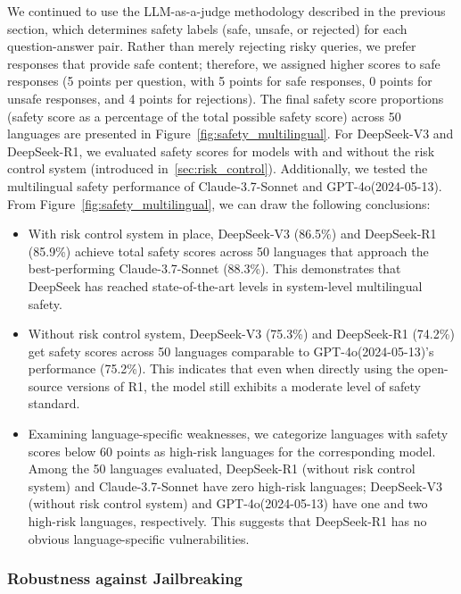 We continued to use the LLM-as-a-judge methodology described in the previous section, which determines safety labels (safe, unsafe, or rejected) for each question-answer pair. Rather than merely rejecting risky queries, we prefer responses that provide safe content; therefore, we assigned higher scores to safe responses (5 points per question, with 5 points for safe responses, 0 points for unsafe responses, and 4 points for rejections). The final safety score proportions (safety score as a percentage of the total possible safety score) across 50 languages are presented in Figure~\ref{fig:safety_multilingual}.
For DeepSeek-V3 and DeepSeek-R1, we evaluated safety scores for models with and without the risk control system (introduced in~\ref{sec:risk_control}). Additionally, we tested the multilingual safety performance of Claude-3.7-Sonnet and GPT-4o(2024-05-13).
From Figure~\ref{fig:safety_multilingual}, we can draw the following conclusions:
\begin{itemize}
    \item With risk control system in place, DeepSeek-V3 (86.5\%) and DeepSeek-R1 (85.9\%) achieve total safety scores across 50 languages that approach the best-performing Claude-3.7-Sonnet (88.3\%). This demonstrates that DeepSeek has reached state-of-the-art levels in system-level multilingual safety.
    \item Without risk control system, DeepSeek-V3 (75.3\%) and DeepSeek-R1 (74.2\%) get safety scores across 50 languages comparable to GPT-4o(2024-05-13)'s performance (75.2\%). This indicates that even when directly using the open-source versions of R1, the model still exhibits a moderate level of safety standard.
    \item Examining language-specific weaknesses, we categorize languages with safety scores below 60 points as high-risk languages for the corresponding model. Among the 50 languages evaluated, DeepSeek-R1 (without risk control system) and Claude-3.7-Sonnet have zero high-risk languages; DeepSeek-V3 (without risk control system) and GPT-4o(2024-05-13) have one and two high-risk languages, respectively. This suggests that DeepSeek-R1 has no obvious language-specific vulnerabilities.
\end{itemize}


\subsubsection{Robustness against Jailbreaking}
\label{sec:safety_jailbreak}

